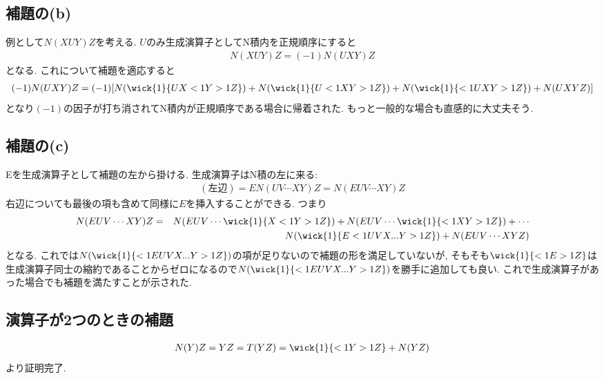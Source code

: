 \documentclass[10.5pt,a4paper]{jreport}
\begin{document}
\subsection{補題の(b)}
例として$N(XUY)Z$を考える. $U$のみ生成演算子としてN積内を正規順序にすると
\begin{eqnarray}
  N(XUY)Z = (-1)N(UXY)Z
\end{eqnarray}
となる. これについて補題を適応すると
\begin{eqnarray}
  (-1)N(UXY)Z = (-1)\qty[N(\wick{1}{UX<1Y>1Z}) + N(\wick{1}{U<1XY>1Z})+ N(\wick{1}{<1UXY>1Z})+ N(UXYZ)]
\end{eqnarray}
となり$(-1)$の因子が打ち消されてN積内が正規順序である場合に帰着された. もっと一般的な場合も直感的に大丈夫そう. 
\subsection{補題の(c)}
Eを生成演算子として補題の左から掛ける. 生成演算子はN積の左に来る:
\begin{eqnarray}
  (左辺) = EN(UV\cdots XY)Z = N(EUV\cdots XY)Z
\end{eqnarray}
右辺についても最後の項も含めて同様に$E$を挿入することができる. つまり
\begin{eqnarray}
\nonumber  N(EUV\cdots XY)Z &=& N(EUV\cdots \wick{1}{X <1Y >1Z}) + N(EUV\cdots \wick{1}{<1X Y >1Z}) + \cdots \\
  && N(\wick{1}{E<1UVX... Y >1Z}) + N(EUV\cdots XYZ)
\end{eqnarray}
となる. これでは$N(\wick{1}{<1EUVX... Y >1Z})$の項が足りないので補題の形を満足していないが, そもそも$\wick{1}{<1E>1Z}$は生成演算子同士の縮約であることからゼロになるので$N(\wick{1}{<1EUVX... Y >1Z})$を勝手に追加しても良い. これで生成演算子があった場合でも補題を満たすことが示された. 
\subsection{演算子が2つのときの補題}
\begin{eqnarray}
  N(Y)Z = YZ = T(YZ) = \wick{1}{<1Y >1Z} + N(YZ)
\end{eqnarray}
より証明完了.
\end{document}
